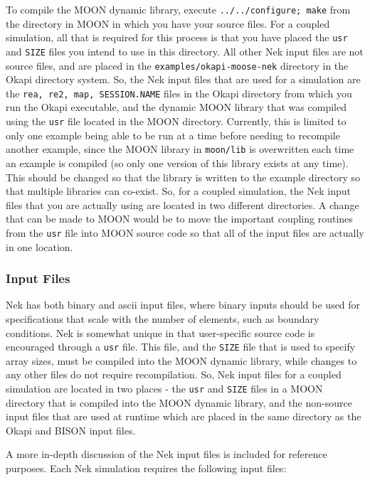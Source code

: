 \documentclass[10pt]{article}
\numberwithin{equation}{section} %
\begin{document}
To compile the MOON dynamic library, execute {\tt ../../configure; make} from the directory in MOON in which you have your source files. For a coupled simulation, all that is required for this process is that you have placed the {\tt usr} and {\tt SIZE} files you intend to use in this directory. All other Nek input files are not source files, and are placed in the {\tt examples/okapi-moose-nek} directory in the Okapi directory system. So, the Nek input files that are used for a simulation are the {\tt rea, re2, map, SESSION.NAME} files in the Okapi directory from which you run the Okapi executable, and the dynamic MOON library that was compiled using the {\tt usr} file located in the MOON directory. \color{magenta} Currently, this is limited to only one example being able to be run at a time before needing to recompile another example, since the MOON library in {\tt moon/lib} is overwritten each time an example is compiled (so only one version of this library exists at any time). This should be changed so that the library is written to the example directory so that multiple libraries can co-exist.\color{black} So, for a coupled simulation, the Nek input files that you are actually using are located in two different directories. \color{magenta} A change that can be made to MOON would be to move the important coupling routines from the {\tt usr} file into MOON source code so that all of the input files are actually in one location. \color{black}

\subsubsection{Input Files}
Nek has both binary and ascii input files, where binary inputs should be used for specifications that scale with the number of elements, such as boundary conditions. Nek is somewhat unique in that user-specific source code is encouraged through a {\tt usr} file. This file, and the {\tt SIZE} file that is used to specify array sizes, must be compiled into the MOON dynamic library, while changes to any other files do not require recompilation. So, Nek input files for a coupled simulation are located in two places - the {\tt usr} and {\tt SIZE} files in a MOON directory that is compiled into the MOON dynamic library, and the non-source input files that are used at runtime which are placed in the same directory as the Okapi and BISON input files.

A more in-depth discussion of the Nek input files is included for reference purposes. Each Nek simulation requires the following input files:
\end{document}
